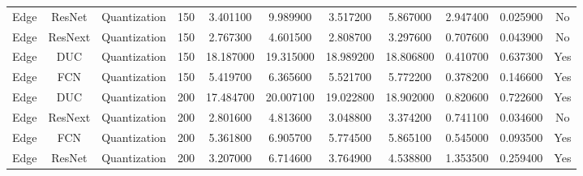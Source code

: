 \begin{tabular}{|c||c||c||c||c||c||c||c||c||c||c|}
Edge & ResNet & Quantization & 150 & 3.401100 & 9.989900 & 3.517200 & 5.867000 & 2.947400 & 0.025900 & No \\
Edge & ResNext & Quantization & 150 & 2.767300 & 4.601500 & 2.808700 & 3.297600 & 0.707600 & 0.043900 & No \\
Edge & DUC & Quantization & 150 & 18.187000 & 19.315000 & 18.989200 & 18.806800 & 0.410700 & 0.637300 & Yes \\
Edge & FCN & Quantization & 150 & 5.419700 & 6.365600 & 5.521700 & 5.772200 & 0.378200 & 0.146600 & Yes \\
Edge & DUC & Quantization & 200 & 17.484700 & 20.007100 & 19.022800 & 18.902000 & 0.820600 & 0.722600 & Yes \\
Edge & ResNext & Quantization & 200 & 2.801600 & 4.813600 & 3.048800 & 3.374200 & 0.741100 & 0.034600 & No \\
Edge & FCN & Quantization & 200 & 5.361800 & 6.905700 & 5.774500 & 5.865100 & 0.545000 & 0.093500 & Yes \\
Edge & ResNet & Quantization & 200 & 3.207000 & 6.714600 & 3.764900 & 4.538800 & 1.353500 & 0.259400 & Yes \\
\bottomrule
\end{tabular}
